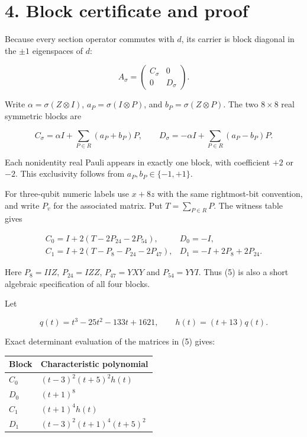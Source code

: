 \documentclass[11pt,letterpaper]{article}
\begin{document}
\section{4. Block certificate and proof}\label{block-certificate-and-proof}

Because every section operator commutes with \(d\), its carrier is block diagonal in the \(\pm1\) eigenspaces of \(d\):

\[A_\sigma=\begin{pmatrix}C_\sigma&0\\0&D_\sigma\end{pmatrix}.\]

Write \(\alpha=\sigma(Z\otimes I)\), \(a_P=\sigma(I\otimes P)\), and \(b_P=\sigma(Z\otimes P)\). The two \(8\times8\) real symmetric blocks are

\[C_\sigma=\alpha I+\sum_{P\in R}(a_P+b_P)P,\qquad
D_\sigma=-\alpha I+\sum_{P\in R}(a_P-b_P)P.
\tag{4}\]

Each nonidentity real Pauli appears in exactly one block, with coefficient \(+2\) or \(-2\). This exclusivity follows from \(a_P,b_P\in\{-1,+1\}\).

For three-qubit numeric labels use \(x+8z\) with the same rightmost-bit convention, and write \(P_v\) for the associated matrix. Put \(T=\sum_{P\in R}P\). The witness table gives

\[\begin{array}{ll}
C_0=I+2(T-2P_{24}-2P_{54}),&
D_0=-I,\\
C_1=I+2(T-P_8-P_{24}-2P_{47}),&
D_1=-I+2P_8+2P_{24}.
\end{array}
\tag{5}\]

Here \(P_8=IIZ\), \(P_{24}=IZZ\), \(P_{47}=YXY\) and \(P_{54}=YYI\). Thus (5) is also a short algebraic specification of all four blocks.

Let

\[q(t)=t^3-25t^2-133t+1621,\qquad
h(t)=(t+13)q(t).\]

Exact determinant evaluation of the matrices in (5) gives:

{\def\LTcaptype{table} %
\begin{longtable}[]{@{}ll@{}}
\toprule\noalign{}
Block & Characteristic polynomial \\
\midrule\noalign{}
\endhead
\bottomrule\noalign{}
\endlastfoot
\(C_0\) & \((t-3)^2(t+5)^2h(t)\) \\
\(D_0\) & \((t+1)^8\) \\
\(C_1\) & \((t+1)^4h(t)\) \\
\(D_1\) & \((t-3)^2(t+1)^4(t+5)^2\) \\
\end{longtable}
}
\end{document}
